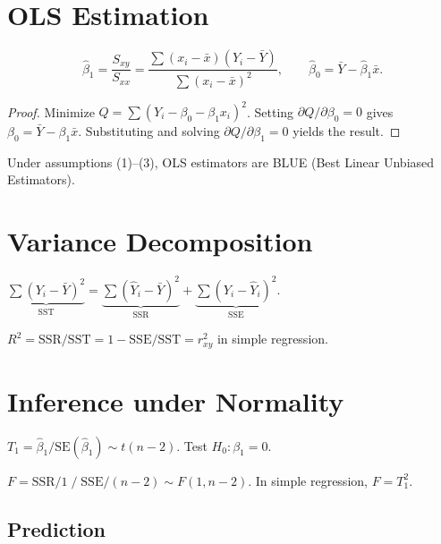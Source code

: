 \section{OLS Estimation}

\begin{theorem}
\[
\hat{\beta}_1 = \frac{S_{xy}}{S_{xx}} = \frac{\sum(x_i-\bar{x})(Y_i-\bar{Y})}{\sum(x_i-\bar{x})^2}, \qquad \hat{\beta}_0 = \bar{Y}-\hat{\beta}_1\bar{x}.
\]
\end{theorem}

\begin{proof}
Minimize $Q=\sum(Y_i-\beta_0-\beta_1 x_i)^2$. Setting $\partial Q/\partial\beta_0=0$ gives $\beta_0=\bar{Y}-\beta_1\bar{x}$. Substituting and solving $\partial Q/\partial\beta_1=0$ yields the result.
\end{proof}

\begin{theorem}
Under assumptions (1)--(3), OLS estimators are BLUE (Best Linear Unbiased Estimators).
\end{theorem}

\section{Variance Decomposition}

\begin{theorem}
$\underbrace{\sum(Y_i-\bar{Y})^2}_{\text{SST}} = \underbrace{\sum(\hat{Y}_i-\bar{Y})^2}_{\text{SSR}} + \underbrace{\sum(Y_i-\hat{Y}_i)^2}_{\text{SSE}}$.
\end{theorem}

\begin{definition}[$R^2$]
$R^2 = \text{SSR}/\text{SST} = 1-\text{SSE}/\text{SST} = r_{xy}^2$ in simple regression.
\end{definition}

\section{Inference under Normality}

$T_1 = \hat{\beta}_1/\mathrm{SE}(\hat{\beta}_1) \sim t(n-2)$. Test $H_0:\beta_1=0$.

$F = \text{SSR}/1 \;/\; \text{SSE}/(n-2) \sim F(1,n-2)$. In simple regression, $F=T_1^2$.

\subsection{Prediction}

